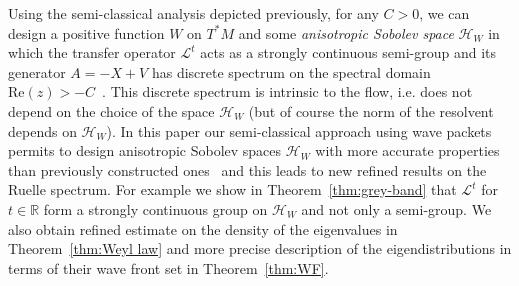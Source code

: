 \documentclass[AHL,Unicode,longabstracts,published]{cedram}
\newcommand{\clH}{\mathcal{H}}
\newcommand{\clL}{\mathcal{L}}
\newcommand{\Ree}{\mathrm{Re}}
\newcommand{\bbR}{\mathbb{R}}
\newcommand{\Ree}{\mathrm{Re}}
\newcommand{\clH}{\mathcal{H}}
\newcommand{\bbR}{\mathbb{R}}
\begin{document}
Using the semi-classical analysis depicted previously, for any $C>0$, we can design a positive function $W$ on $T^{*}M$ and some \emph{anisotropic Sobolev space} $\clH _{W}$ in which the transfer operator $\clL^{t}$ acts as a strongly continuous semi-group and its generator $A=-X+V$ has discrete spectrum on the spectral domain $\Ree(z)>-C$~\cite{liverani_butterley_07,fred_flow_09}. This discrete spectrum is intrinsic to the flow, i.e. does not depend on the choice of the space $\clH _{W}$ (but of course the norm of the resolvent depends on $\clH _{W}$). In this paper our semi-classical approach using wave packets permits to design anisotropic Sobolev spaces $\clH _{W}$ with more accurate properties than previously constructed ones~\cite{fred_flow_09} and this leads to new refined results on the Ruelle spectrum. For example we show in Theorem~\ref{thm:grey-band} that $\clL^{t}$ for $t\in\bbR$ form a strongly continuous group on $\clH _{W}$ and not only a semi-group. We also obtain refined estimate on the density of the eigenvalues in Theorem~\ref{thm:Weyl law} and more precise description of the eigendistributions in terms of their wave front set in Theorem~\ref{thm:WF}.
\end{document}

